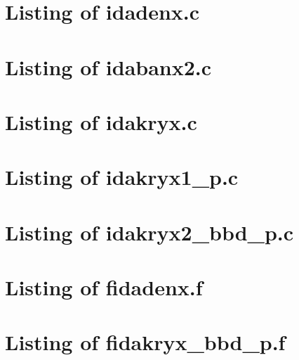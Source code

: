 
\newpage
\section{Listing of idadenx.c}\label{s:idadenx_c}

\newpage
\section{Listing of idabanx2.c}\label{s:idabanx2_c}

\newpage
\section{Listing of idakryx.c}\label{s:idakryx_c}


\newpage
\section{Listing of idakryx1\_p.c}\label{s:idakryx1_p_c}

\newpage
\section{Listing of idakryx2\_bbd\_p.c}\label{s:idakryx2_bbd_p_c}

\newpage
\section{Listing of fidadenx.f}\label{s:fidadenx_f}

\newpage
\section{Listing of fidakryx\_bbd\_p.f}\label{s:fidakryx_bbd_p}
